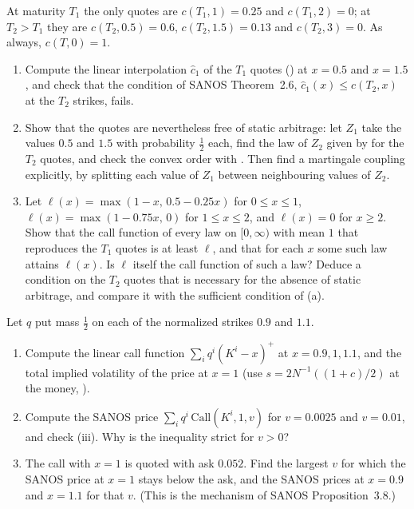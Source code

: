\begin{exercise}\label{ex:afs-grids}
\medium At maturity $T_1$ the only quotes are $c(T_1,1)=0.25$ and $c(T_1,2)=0$; at $T_2>T_1$ they are $c(T_2,0.5)=0.6$,
$c(T_2,1.5)=0.13$ and $c(T_2,3)=0$. As always, $c(T,0)=1$.
\begin{enumerate}[label=(\alph*)]
  \item Compute the linear interpolation $\hat c_1$ of the $T_1$ quotes () at $x=0.5$ and $x=1.5$, and check
    that the condition of SANOS Theorem~2.6, $\hat c_1(x)\le c(T_2,x)$ at the $T_2$ strikes, fails.
  \item Show that the quotes are nevertheless free of static arbitrage: let $Z_1$ take the values $0.5$ and $1.5$ with probability
    $\frac12$ each, find the law of $Z_2$ given by  for the $T_2$ quotes, and check the convex order with
    . Then find a martingale coupling explicitly, by splitting each value of $Z_1$ between neighbouring
    values of $Z_2$.
  \item Let $\ell(x)=\max(1-x,\,0.5-0.25x)$ for $0\le x\le1$, $\ell(x)=\max(1-0.75x,\,0)$ for $1\le x\le2$, and $\ell(x)=0$ for $x\ge2$.
    Show that the call function of every law on $[0,\infty)$ with mean $1$ that reproduces the $T_1$ quotes is at least $\ell$, and that
    for each $x$ some such law attains $\ell(x)$. Is $\ell$ itself the call function of such a law? Deduce a condition on the $T_2$ quotes
    that is necessary for the absence of static arbitrage, and compare it with the sufficient condition of (a).
\end{enumerate}
\end{exercise}

\begin{exercise}\label{ex:afs-smoothing}
\easy Let $q$ put mass $\frac12$ on each of the normalized strikes $0.9$ and $1.1$.
\begin{enumerate}[label=(\alph*)]
  \item Compute the linear call function $\sum_iq^i(K^i-x)^+$ at $x=0.9,1,1.1$, and the total implied volatility of the price at $x=1$
    (use $s=2N^{-1}((1+c)/2)$ at the money, ).
  \item Compute the SANOS price $\sum_iq^i\,\mathrm{Call}(K^i,1,v)$ for $v=0.0025$ and $v=0.01$, and check
    (iii). Why is the inequality strict for $v>0$?
  \item The call with $x=1$ is quoted with ask $0.052$. Find the largest $v$ for which the SANOS price at $x=1$ stays below the ask,
    and the SANOS prices at $x=0.9$ and $x=1.1$ for that $v$. (This is the mechanism of SANOS Proposition~3.8.)
\end{enumerate}
\end{exercise}


